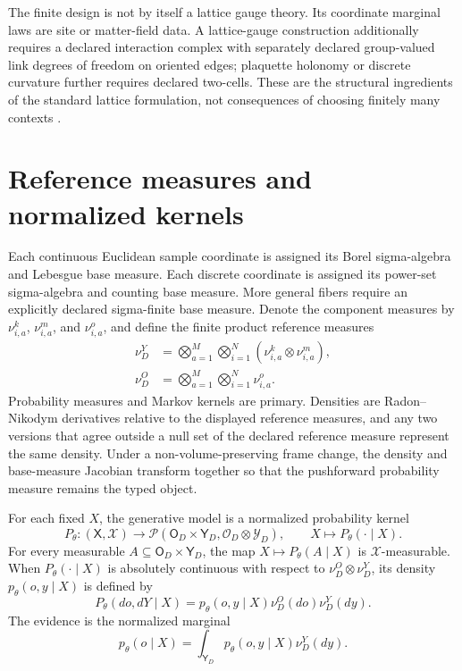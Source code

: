 The finite design is not by itself a lattice gauge theory. Its coordinate marginal laws are site or matter-field data. A lattice-gauge construction additionally requires a declared interaction complex with separately declared group-valued link degrees of freedom on oriented edges; plaquette holonomy or discrete curvature further requires declared two-cells. These are the structural ingredients of the standard lattice formulation, not consequences of choosing finitely many contexts \citep{WilsonConfinement1974,KogutSusskind1975,Creutz1983}.

\section{Reference measures and normalized kernels}

Each continuous Euclidean sample coordinate is assigned its Borel sigma-algebra and Lebesgue base measure. Each discrete coordinate is assigned its power-set sigma-algebra and counting base measure. More general fibers require an explicitly declared sigma-finite base measure. Denote the component measures by \(\nu^k_{i,a}\), \(\nu^m_{i,a}\), and \(\nu^o_{i,a}\), and define the finite product reference measures
\begin{align}
\nu_D^Y
&=\bigotimes_{a=1}^{M}\bigotimes_{i=1}^{N}
\left(\nu^k_{i,a}\otimes\nu^m_{i,a}\right),
\label{eq:latent-reference-measure}\\
\nu_D^O
&=\bigotimes_{a=1}^{M}\bigotimes_{i=1}^{N}\nu^o_{i,a}.
\label{eq:observation-reference-measure}
\end{align}
Probability measures and Markov kernels are primary. Densities are Radon--Nikodym derivatives relative to the displayed reference measures, and any two versions that agree outside a null set of the declared reference measure represent the same density. Under a non-volume-preserving frame change, the density and base-measure Jacobian transform together so that the pushforward probability measure remains the typed object.

For each fixed \(X\), the generative model is a normalized probability kernel
\begin{equation}
P_\theta:(\mathsf X,\mathscr X)\longrightarrow
\mathcal P\left(\mathsf O_D\times\mathsf Y_D,
\mathscr O_D\otimes\mathscr Y_D\right),
\qquad
X\longmapsto P_\theta(\mathord\cdot\mid X).
\label{eq:generative-kernel-type}
\end{equation}
For every measurable \(A\subseteq\mathsf O_D\times\mathsf Y_D\), the map \(X\mapsto P_\theta(A\mid X)\) is \(\mathscr X\)-measurable. When \(P_\theta(\mathord\cdot\mid X)\) is absolutely continuous with respect to \(\nu_D^O\otimes\nu_D^Y\), its density \(p_\theta(o,y\mid X)\) is defined by
\begin{equation}
P_\theta(do,dY\mid X)
=p_\theta(o,y\mid X)\nu_D^O(do)\nu_D^Y(dy).
\label{eq:generative-density-reference-measures}
\end{equation}
The evidence is the normalized marginal
\begin{equation}
p_\theta(o\mid X)
=\int_{\mathsf Y_D}p_\theta(o,y\mid X)\nu_D^Y(dy).
\label{eq:evidence-density-definition}
\end{equation}

